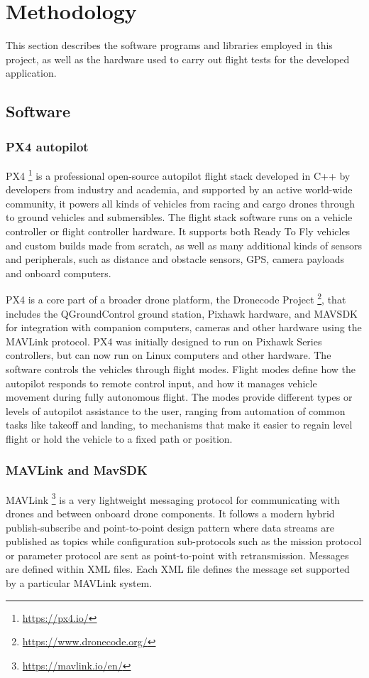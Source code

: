 \section{Methodology}

This section describes the software programs and libraries employed in this project, as well as the hardware used to carry out flight tests for the developed application.

\subsection{Software}

\subsubsection{PX4 autopilot}
\label{subsec:px4}
PX4 \footnote{\url{https://px4.io/}} is a professional open-source autopilot flight stack developed in C++ by developers from industry and academia, and supported by an active world-wide community,
it powers all kinds of vehicles from racing and cargo drones through to ground vehicles and submersibles.
The flight stack software runs on a vehicle controller or flight controller hardware. It supports both Ready To Fly vehicles and custom builds made from scratch,
as well as many additional kinds of sensors and peripherals, such as distance and obstacle sensors, GPS, camera payloads and onboard computers.

PX4 is a core part of a broader drone platform, the Dronecode Project \footnote{\url{https://www.dronecode.org/}}, that includes the QGroundControl ground station, Pixhawk hardware,
and MAVSDK for integration with companion computers, cameras and other hardware using the MAVLink protocol.
PX4 was initially designed to run on Pixhawk Series controllers, but can now run on Linux computers and other hardware.
The software controls the vehicles through flight modes. 
Flight modes define how the autopilot responds to remote control input, and how it manages vehicle movement during fully autonomous flight.
The modes provide different types or levels of autopilot assistance to the user, ranging from automation of common tasks like takeoff and landing, 
to mechanisms that make it easier to regain level flight or hold the vehicle to a fixed path or position.

\subsubsection{MAVLink and MavSDK}
\label{subsec:mavlink}
MAVLink \footnote{\url{https://mavlink.io/en/}} is a very lightweight messaging protocol for communicating with drones and between onboard drone components. 
It follows a modern hybrid publish-subscribe and point-to-point design pattern 
where data streams are published as topics while configuration sub-protocols 
such as the mission protocol or parameter protocol are sent as point-to-point with retransmission. 
Messages are defined within XML files. 
Each XML file defines the message set supported by a particular MAVLink system.

